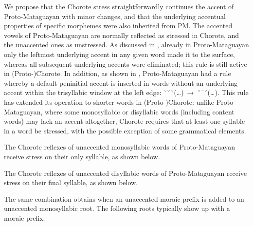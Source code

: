 We propose that the Chorote stress straightforwardly continues the accent of Proto-Mataguayan with minor changes, and that the underlying accentual properties of specific morphemes were also inherited from PM. The accented vowels of Proto-Mataguayan are normally reflected as stressed in Chorote, and the unaccented ones as unstressed. As discussed in , already in Proto-Mataguayan only the leftmost underlying accent in any given word made it to the surface, whereas all subsequent underlying accents were eliminated; this rule is still active in (Proto-)Chorote. In addition, as shown in , Proto-Mataguayan had a rule whereby a default peninitial accent is inserted in words without an underlying accent within the trisyllabic window at the left edge: ˘˘˘(…)~→~˘¯˘(…). This rule has  extended its operation to shorter words in  (Proto-)Chorote: unlike Proto-Mataguayan, where some monosyllabic or disyllabic words (including content words) may lack an accent altogether, Chorote requires that at least one syllable in a word be stressed, with the possible exception of some grammatical elements.

The Chorote reflexes of unaccented monosyllabic words of Proto-Mataguayan receive stress on their only syllable, as shown below.

\begin{exe}
    \ex \goaway
    \ex \cry
    \ex \fooditssg
    \ex \thorneitssg
    \ex \sprout
    \ex \spillcwimp
    \ex \grass
    \ex \cordits
    \ex \diecw
    \ex \stepv
    \ex \skinits
    \ex \good
\end{exe}

The Chorote reflexes of unaccented disyllabic words of Proto-Mataguayan receive stress on their final syllable, as shown below.

\begin{exe}
    \ex \jaguar
    \ex \treensg
    \ex \mancwsg
    \ex \vulturesg
    \ex \holeabs
    \ex \two
    \ex \starnsg
    \ex \bromelia
    \ex \nightncw
    \ex \earthcwsg
    \ex \fatalhaitssg
    \ex \aloja
    \ex \doradocwsg
    \ex \meatitssg
\end{exe}

The same combination obtains when an unaccented moraic prefix is added to an unaccented monosyllabic root. The following roots typically show up with a moraic prefix:

\begin{exe}
    \ex \tailsg
    \ex \torn
    \ex \handsg
    \ex \hornclubsg
    \ex \languagewordsg
    \ex \toolnsg
    \ex \lousesg
    \ex \yicalhuksg
    \ex \sleep
    \ex \smelln
    \ex \fatpesg
    \ex \fence
    \ex \lid
    \ex \basetrunk
    \ex \spillcw
    \ex \placen
    \ex \necksg
    \ex \clothes
\end{exe}

